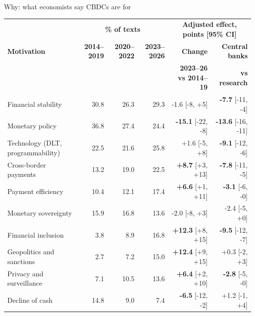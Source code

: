 \documentclass[aspectratio=169,10pt]{beamer}
\begin{document}
\begin{frame}{Why: what economists say CBDCs are for}
\scriptsize
\setlength{\tabcolsep}{4pt}
\begin{tabular}{@{}p{}rrrrr@{}}\toprule
 & \multicolumn{3}{c}{\textbf{\% of texts}} & \multicolumn{2}{c}{\textbf{Adjusted effect, points [95\% CI]}}\\
\textbf{Motivation} & \textbf{2014--2019} & \textbf{2020--2022} & \textbf{2023--2026} & \textbf{Change} & \textbf{Central banks}\\
 & & & & \textbf{2023--26 vs 2014--19} & \textbf{vs research}\\\midrule
Financial stability & \cellcolor{c1!46}30.8 & \cellcolor{c1!39}26.3 & \cellcolor{c1!43}29.3 & {-1.6} \tiny[-8, +5] & \textbf{-7.7} \tiny[-11, -4] \\
Monetary policy & \cellcolor{c1!55}36.8 & \cellcolor{c1!41}27.4 & \cellcolor{c1!36}24.4 & \textbf{-15.1} \tiny[-22, -8] & \textbf{-13.6} \tiny[-16, -11] \\
Technology (DLT, programmability) & \cellcolor{c1!33}22.5 & \cellcolor{c1!32}21.6 & \cellcolor{c1!38}25.8 & {+1.6} \tiny[-5, +8] & \textbf{-9.1} \tiny[-12, -6] \\
Cross-border payments & \cellcolor{c1!19}13.2 & \cellcolor{c1!28}19.0 & \cellcolor{c1!33}22.5 & \textbf{+8.7} \tiny[+3, +13] & \textbf{-7.8} \tiny[-11, -5] \\
Payment efficiency & \cellcolor{c1!15}10.4 & \cellcolor{c1!18}12.1 & \cellcolor{c1!26}17.4 & \textbf{+6.6} \tiny[+1, +11] & \textbf{-3.1} \tiny[-6, -0] \\
Monetary sovereignty & \cellcolor{c1!23}15.9 & \cellcolor{c1!25}16.8 & \cellcolor{c1!20}13.6 & {-2.0} \tiny[-8, +3] & {-2.4} \tiny[-5, +0] \\
Financial inclusion & \cellcolor{c1!5}3.8 & \cellcolor{c1!13}8.9 & \cellcolor{c1!25}16.8 & \textbf{+12.3} \tiny[+8, +15] & \textbf{-9.5} \tiny[-12, -7] \\
Geopolitics and sanctions & \cellcolor{c1!4}2.7 & \cellcolor{c1!10}7.2 & \cellcolor{c1!22}15.0 & \textbf{+12.4} \tiny[+9, +15] & {+0.3} \tiny[-2, +3] \\
Privacy and surveillance & \cellcolor{c1!10}7.1 & \cellcolor{c1!15}10.5 & \cellcolor{c1!20}13.6 & \textbf{+6.4} \tiny[+2, +10] & \textbf{-2.8} \tiny[-5, -0] \\
Decline of cash & \cellcolor{c1!22}14.8 & \cellcolor{c1!13}9.0 & \cellcolor{c1!11}7.4 & \textbf{-6.5} \tiny[-12, -2] & {+1.2} \tiny[-1, +4] \\

\end{tabular}
\end{frame}
\end{document}
